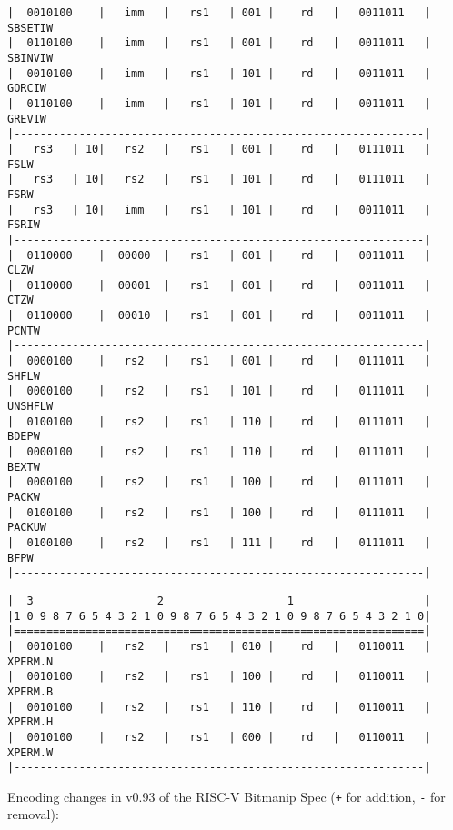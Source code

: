 \begin{minipage}{\linewidth}
\begin{verbatim}
|  0010100    |   imm   |   rs1   | 001 |    rd   |   0011011   |  SBSETIW
|  0110100    |   imm   |   rs1   | 001 |    rd   |   0011011   |  SBINVIW
|  0010100    |   imm   |   rs1   | 101 |    rd   |   0011011   |  GORCIW
|  0110100    |   imm   |   rs1   | 101 |    rd   |   0011011   |  GREVIW
|---------------------------------------------------------------|
|   rs3   | 10|   rs2   |   rs1   | 001 |    rd   |   0111011   |  FSLW
|   rs3   | 10|   rs2   |   rs1   | 101 |    rd   |   0111011   |  FSRW
|   rs3   | 10|   imm   |   rs1   | 101 |    rd   |   0011011   |  FSRIW
|---------------------------------------------------------------|
|  0110000    |  00000  |   rs1   | 001 |    rd   |   0011011   |  CLZW
|  0110000    |  00001  |   rs1   | 001 |    rd   |   0011011   |  CTZW
|  0110000    |  00010  |   rs1   | 001 |    rd   |   0011011   |  PCNTW
|---------------------------------------------------------------|
|  0000100    |   rs2   |   rs1   | 001 |    rd   |   0111011   |  SHFLW
|  0000100    |   rs2   |   rs1   | 101 |    rd   |   0111011   |  UNSHFLW
|  0100100    |   rs2   |   rs1   | 110 |    rd   |   0111011   |  BDEPW
|  0000100    |   rs2   |   rs1   | 110 |    rd   |   0111011   |  BEXTW
|  0000100    |   rs2   |   rs1   | 100 |    rd   |   0111011   |  PACKW
|  0100100    |   rs2   |   rs1   | 100 |    rd   |   0111011   |  PACKUW
|  0100100    |   rs2   |   rs1   | 111 |    rd   |   0111011   |  BFPW
|---------------------------------------------------------------|
\end{verbatim}
\end{minipage}

\begin{minipage}{\linewidth}
\begin{verbatim}
|  3                   2                   1                    |
|1 0 9 8 7 6 5 4 3 2 1 0 9 8 7 6 5 4 3 2 1 0 9 8 7 6 5 4 3 2 1 0|
|===============================================================|
|  0010100    |   rs2   |   rs1   | 010 |    rd   |   0110011   |  XPERM.N
|  0010100    |   rs2   |   rs1   | 100 |    rd   |   0110011   |  XPERM.B
|  0010100    |   rs2   |   rs1   | 110 |    rd   |   0110011   |  XPERM.H
|  0010100    |   rs2   |   rs1   | 000 |    rd   |   0110011   |  XPERM.W
|---------------------------------------------------------------|
\end{verbatim}
\end{minipage}


Encoding changes in v0.93 of the RISC-V Bitmanip Spec ({\tt +} for addition,
{\tt -} for removal):

